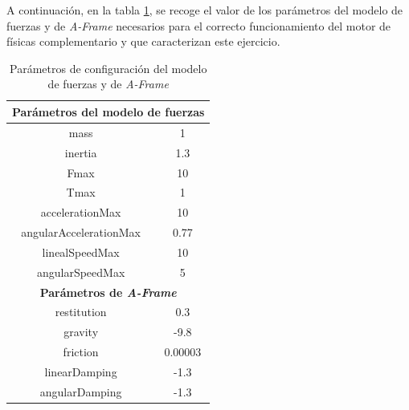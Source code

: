 \clearpage

A continuación, en la tabla \ref{tabla:param_ej1}, se recoge el valor de los parámetros del modelo de fuerzas y de  \textit{A-Frame} necesarios para el correcto funcionamiento del motor de físicas complementario y que caracterizan este ejercicio.

\begin{table}[h!]
\centering
\begin{tabular}{|c|c|}
\hline
\multicolumn{2}{|c|}{\textbf{Parámetros del modelo de fuerzas}}                \\ \hline
mass                                           & 1                             \\ \hline
inertia                                        & 1.3                           \\ \hline
Fmax                                           & 10                            \\ \hline
Tmax                                           & 1                             \\ \hline
accelerationMax                                & 10                            \\ \hline
angularAccelerationMax                         & 0.77                          \\ \hline
linealSpeedMax                                 & 10                            \\ \hline
angularSpeedMax                                & 5                             \\ \hline
\multicolumn{2}{|c|}{\textbf{Parámetros de \textit{A-Frame}}} \\ \hline
restitution                                    & 0.3                           \\ \hline
gravity                                        & -9.8                          \\ \hline
friction                                       & 0.00003                       \\ \hline
linearDamping                                  & -1.3                          \\ \hline
angularDamping                                 & -1.3                          \\ \hline
\end{tabular}
\caption{Parámetros de configuración del modelo de fuerzas y de \textit{A-Frame}}
\label{tabla:param_ej1}
\end{table}

